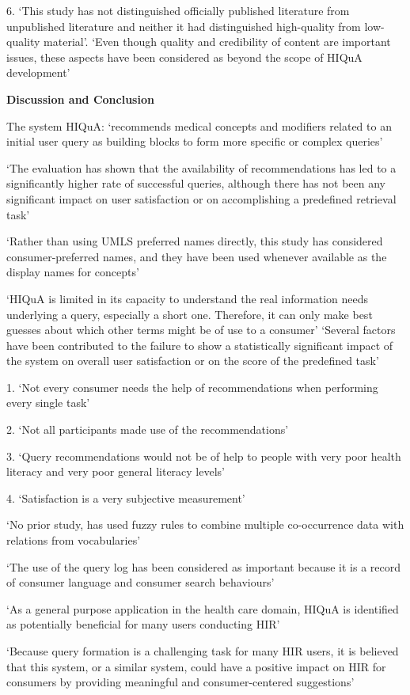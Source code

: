 \documentclass[]{article}
\begin{document}
6.	‘This study has not distinguished officially published literature from unpublished literature and neither it had distinguished high-quality from low-quality material’. ‘Even though quality and credibility of content are important issues, these aspects have been considered as beyond the scope of HIQuA development’ 

\textbf{Discussion and Conclusion}

The system HIQuA: ‘recommends medical concepts and modifiers related to an initial user query as building blocks to form more specific or complex queries’

‘The evaluation has shown that the availability of recommendations has led to a significantly higher rate of successful queries, although there has not been any significant impact on user satisfaction or on accomplishing a predefined retrieval task’

‘Rather than using UMLS preferred names directly, this study has considered consumer-preferred names, and they have been used whenever available as the display names for concepts’

‘HIQuA is limited in its capacity to understand the real information needs underlying a query, especially a short one. Therefore, it can only make best guesses about which other terms might be of use to a consumer’
‘Several factors have been contributed to the failure to show a statistically significant impact of the system on overall user satisfaction or on the score of the predefined task’

1.	‘Not every consumer needs the help of recommendations when performing every single task’ 

2.	‘Not all participants made use of the recommendations’

3.	‘Query recommendations would not be of help to people with very poor health literacy and very poor
 general literacy levels’
 
4.	‘Satisfaction is a very subjective measurement’

‘No prior study, has used fuzzy rules to combine multiple co-occurrence data with relations from vocabularies’

‘The use of the query log has been considered as important because it is a record of consumer language and consumer search behaviours’

‘As a general purpose application in the health care domain, HIQuA is identified as potentially beneficial for many users conducting HIR’

‘Because query formation is a challenging task for many HIR users, it is believed that this system, or a similar system, could have a positive impact on HIR for consumers by providing meaningful and consumer-centered suggestions’
\end{document}
